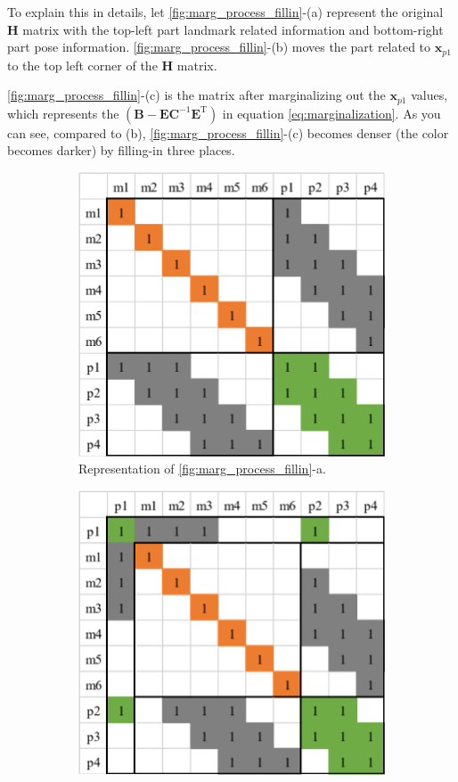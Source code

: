 \documentclass[12pt]{report}   %
\begin{document}
To explain this in details, let \ref{fig:marg_process_fillin}-(a) represent the original $\bm{H}$ matrix with the top-left part landmark related information and bottom-right part pose information. \ref{fig:marg_process_fillin}-(b) moves the part related to $\bm{x}_{p1}$ to the top left corner of the $\bm{H}$ matrix.

\ref{fig:marg_process_fillin}-(c) is the matrix after marginalizing out the $\bm{x}_{p1}$ values, which represents the $\left( \bm{B} - \bm{E}\bm{C}^{-1}\bm{E}^\mathrm{T} \right)$ in equation \eqref{eq:marginalization}. As you can see, compared to (b), \ref{fig:marg_process_fillin}-(c) becomes denser (the color becomes darker) by filling-in three places.

\begin{figure}[H]
	\centering
	\begin{subfigure}[t]{.4\linewidth}
	\centering\includegraphics[width=.8\linewidth]{figures/marg_01.png}
	\caption{Representation of \ref{fig:marg_process_fillin}-a.}
	\end{subfigure}
	\begin{subfigure}[t]{.4\linewidth}
		\centering\includegraphics[width=.8\linewidth]{figures/marg_02.png}

\end{subfigure}
\end{figure}
\end{document}
